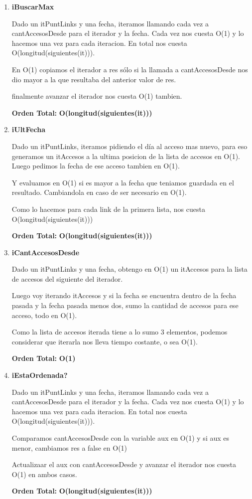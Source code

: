 \begin{enumerate}
\item\textbf{iBuscarMax}
\par Dado un itPuntLinks y una fecha, iteramos llamando cada vez a cantAccesosDesde para el iterador y la fecha. Cada vez nos cuesta O(1) y lo hacemos una vez para cada iteracion. En total nos cuesta O(longitud(siguientes(it))).
\par En O(1) copiamos el iterador a res sólo si la llamada a cantAccesosDesde nos dio mayor a la que resultaba del anterior valor de res.
\par finalmente avanzar el iterador nos cuesta O(1) tambien.
\par \textbf{Orden Total:} \textbf{O(longitud(siguientes(it)))}

\item\textbf{iUltFecha}
\par Dado un itPuntLinks, iteramos pidiendo el día al acceso mas nuevo, para eso generamos un itAccesos a la ultima posicion de la lista de accesos en O(1). Luego pedimos la fecha de ese acceso tambien en O(1).
\par Y evaluamos en O(1) si es mayor a la fecha que teniamos guardada en el resultado. Cambiandola en caso de ser necesario en O(1).
\par Como lo hacemos para cada link de la primera lista, nos cuesta O(longitud(siguientes(it)))
\par \textbf{Orden Total:} \textbf{O(longitud(siguientes(it)))}

\item\textbf{iCantAccesosDesde}
\par Dado un itPuntLinks y una fecha, obtengo en O(1) un itAccesos para la lista de accesos del siguiente del iterador.
\par Luego voy iterando itAccesos y si la fecha se encuentra dentro de la fecha pasada y la fecha pasada menos dos, sumo la cantidad de accesos para ese acceso, todo en O(1).
\par Como la lista de accesos iterada tiene a lo sumo 3 elementos, podemos considerar que iterarla nos lleva tiempo costante, o sea O(1).
\par \textbf{Orden Total:} \textbf{O(1)}

\item\textbf{iEstaOrdenada?}
\par Dado un itPuntLinks y una fecha, iteramos llamando cada vez a cantAccesosDesde para el iterador y la fecha. Cada vez nos cuesta O(1) y lo hacemos una vez para cada iteracion. En total nos cuesta O(longitud(siguientes(it))).
\par Comparamos cantAccesosDesde con la variable aux en O(1) y si aux es menor, cambiamos res a false en O(1)
\par Actualizaar el aux con cantAccesosDesde y avanzar el iterador nos cuesta O(1) en ambos casos.
\par \textbf{Orden Total:} \textbf{O(longitud(siguientes(it)))}

\end{enumerate}